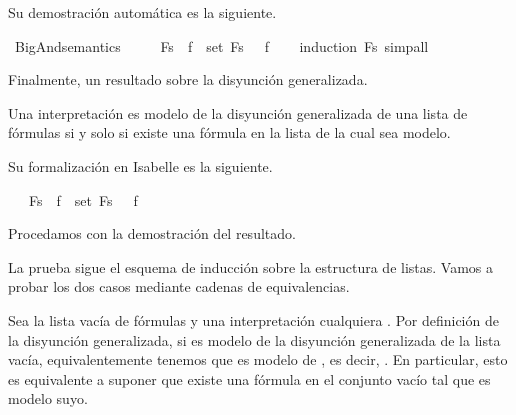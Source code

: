 \begin{isabellebody}
\isamarkupfalse%
%
\endisatagproof
{\isafoldproof}%
%
\isadelimproof
%
\endisadelimproof
%
\begin{isamarkuptext}%
Su demostración automática es la siguiente.%
\end{isamarkuptext}\isamarkuptrue%
\isamarkupfalse%
\ BigAnd{\isacharunderscore}semantics{\isacharcolon}\ \isanewline
\ \ {\isachardoublequoteopen}{\isacharparenleft}{\isasymA}\ {\isasymTurnstile}\ \isactrlbold {\isasymAnd}Fs{\isacharparenright}\ {\isasymlongleftrightarrow}\ {\isacharparenleft}{\isasymforall}f\ {\isasymin}\ set\ Fs{\isachardot}\ {\isasymA}\ {\isasymTurnstile}\ f{\isacharparenright}{\isachardoublequoteclose}\isanewline
%
\isadelimproof
\ \ %
\endisadelimproof
%
\isatagproof
{}\isamarkupfalse%
\ {\isacharparenleft}induction\ Fs{\isacharparenright}\ simp{\isacharunderscore}all%
\endisatagproof
{\isafoldproof}%
%
\isadelimproof
%
\endisadelimproof
%
\begin{isamarkuptext}%
Finalmente, un resultado sobre la disyunción generalizada.

  \begin{lema}
    Una interpretación es modelo de la disyunción generalizada de una 
    lista de fórmulas si y solo si existe una fórmula en la lista de la
    cual sea modelo.
  \end{lema}

  Su formalización en Isabelle es la siguiente.%
\end{isamarkuptext}\isamarkuptrue%
\isamarkupfalse%
\ {\isachardoublequoteopen}{\isacharparenleft}{\isasymA}\ {\isasymTurnstile}\ \isactrlbold {\isasymOr}Fs{\isacharparenright}\ {\isasymlongleftrightarrow}\ {\isacharparenleft}{\isasymexists}f\ {\isasymin}\ set\ Fs{\isachardot}\ {\isasymA}\ {\isasymTurnstile}\ f{\isacharparenright}{\isachardoublequoteclose}\ \isanewline
%
\isadelimproof
\ \ %
\endisadelimproof
%
\isatagproof
{}\isamarkupfalse%
%
\endisatagproof
{\isafoldproof}%
%
\isadelimproof
%
\endisadelimproof
%
\begin{isamarkuptext}%
Procedamos con la demostración del resultado.

  \begin{demostracion}
    La prueba sigue el esquema de inducción sobre la estructura de
    listas. Vamos a probar los dos casos mediante cadenas de 
    equivalencias.

    Sea la lista vacía de fórmulas y una interpretación cualquiera
    \isa{{\isasymA}}. Por definición de la disyunción generalizada, si \isa{{\isasymA}} es
    modelo de la disyunción generalizada de la lista vacía,
    equivalentemente tenemos que es modelo de \isa{{\isasymbottom}}, es decir, .
    En particular, esto es equivalente a suponer que existe una fórmula 
    en el conjunto vacío tal que \isa{{\isasymA}} es modelo suyo.


\end{demostracion}
\end{isamarkuptext}
\end{isabellebody}
